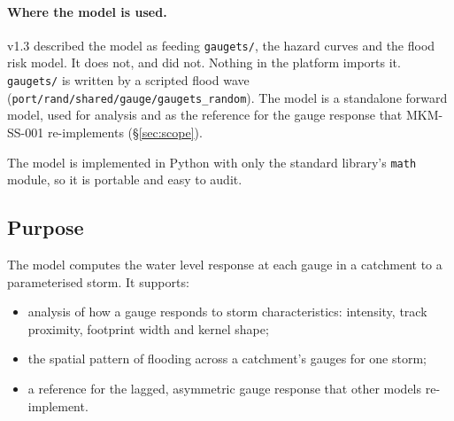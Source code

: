 \documentclass[11pt,a4paper]{article}
\begin{document}
\paragraph{Where the model is used.} v1.3 described the model as feeding
\texttt{gaugets/}, the hazard curves and the flood risk model. It does not, and did not.
Nothing in the platform imports it. \texttt{gaugets/} is written by a scripted flood wave
(\texttt{port/rand/shared/gauge/gaugets\_random}). The model is a standalone forward
model, used for analysis and as the reference for the gauge response that MKM-SS-001
re-implements (\S\ref{sec:scope}).

The model is implemented in Python with only the standard library's \texttt{math}
module, so it is portable and easy to audit.

\mkmpurpose

\subsection{Purpose}
The model computes the water level response at each gauge in a catchment to a
parameterised storm. It supports:
\begin{itemize}[nosep]
    \item analysis of how a gauge responds to storm characteristics: intensity, track
          proximity, footprint width and kernel shape;
    \item the spatial pattern of flooding across a catchment's gauges for one storm;
    \item a reference for the lagged, asymmetric gauge response that other models
          re-implement.
\end{itemize}
\end{document}
